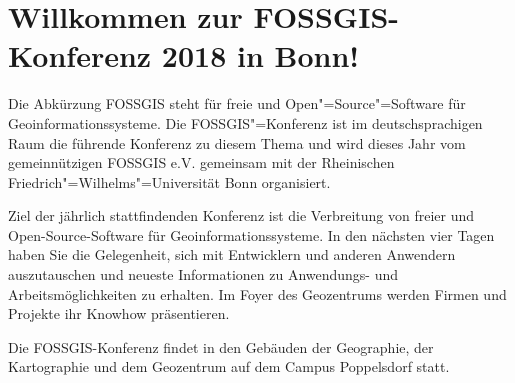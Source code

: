 \newpage
\section*{Willkommen zur FOSSGIS-Konferenz 2018 in Bonn!} \label{welcome}
Die Abkürzung FOSSGIS steht
für freie und Open"=Source"=Software für Geoinformationssysteme.
Die FOSSGIS"=Konferenz ist im deutschsprachigen Raum die führende Konferenz zu diesem Thema
und wird dieses Jahr vom gemeinnützigen FOSSGIS e.V.
gemeinsam mit der Rheinischen Friedrich"=Wilhelms"=Universität Bonn organisiert.

Ziel der jährlich stattfindenden Konferenz ist die Verbreitung von freier und
Open-Source-Software für Geoinformationssysteme.  In den nächsten vier Tagen
haben Sie die Gelegenheit, sich mit Entwicklern und anderen Anwendern auszutauschen und
neueste Informationen zu Anwendungs- und Arbeitsmöglichkeiten zu erhalten. Im
Foyer des Geozentrums werden Firmen und Projekte ihr Knowhow präsentieren.

Die FOSSGIS-Konferenz findet in den Gebäuden der Geographie, der Kartographie und dem Geozentrum auf dem Campus Poppelsdorf statt.

\newpage


